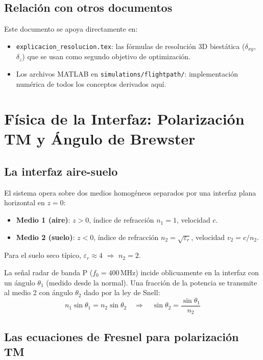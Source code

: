 \documentclass[12pt,a4paper,oneside]{book}
\newcommand{\nuno}{n_1}
\newcommand{\ndos}{n_2}
\newcommand{\dxy}{\delta_{xy}}
\newcommand{\dz}{\delta_z}
\begin{document}
\section{Relación con otros documentos}

Este documento se apoya directamente en:
\begin{itemize}
  \item \texttt{explicacion\_resolucion.tex}: las fórmulas de resolución 3D biestática ($\dxy$, $\dz$) que se usan como segundo objetivo de optimización.
  \item Los archivos MATLAB en \texttt{simulations/flightpath/}: implementación numérica de todos los conceptos derivados aquí.
\end{itemize}

\chapter{Física de la Interfaz: Polarización TM y Ángulo de Brewster}

\section{La interfaz aire-suelo}

El sistema opera sobre dos medios homogéneos separados por una interfaz plana horizontal en $z=0$:
\begin{itemize}
  \item \textbf{Medio 1 (aire)}: $z > 0$, índice de refracción $\nuno = 1$, velocidad $c$.
  \item \textbf{Medio 2 (suelo)}: $z < 0$, índice de refracción $\ndos = \sqrt{\varepsilon_r}$, velocidad $v_2 = c/\ndos$.
\end{itemize}

Para el suelo seco típico, $\varepsilon_r \approx 4$ $\Rightarrow$ $\ndos = 2$.

La señal radar de banda P ($f_0 = 400\,\text{MHz}$) incide oblicuamente en la interfaz con un ángulo $\theta_1$ (medido desde la normal). Una fracción de la potencia se transmite al medio 2 con ángulo $\theta_2$ dado por la ley de Snell:
\[
\nuno\sin\theta_1 = \ndos\sin\theta_2
\quad\Longrightarrow\quad
\sin\theta_2 = \frac{\sin\theta_1}{\ndos}
\]

\section{Las ecuaciones de Fresnel para polarización TM}
\end{document}
